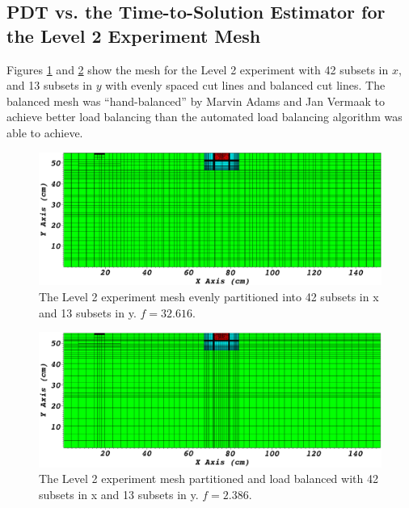 \FloatBarrier
\subsection{PDT vs. the Time-to-Solution Estimator for the Level 2 Experiment Mesh}
Figures \ref{level2_42x13} and \ref{level2_42x13_balanced} show the mesh for the Level 2 experiment with 42 subsets in $x$, and 13 subsets in $y$ with evenly spaced cut lines and balanced cut lines.
The balanced mesh was ``hand-balanced'' by Marvin Adams and Jan Vermaak to achieve better load balancing than the automated load balancing algorithm was able to achieve.
\begin{figure}[H]
\centering
\includegraphics[scale=0.28]{../../figures/level2_42x13.png}
\caption{The Level 2 experiment mesh evenly partitioned into 42 subsets in x and 13 subsets in y. $f = 32.616$.}
\label{level2_42x13}
\end{figure}
\begin{figure}[H]
\centering
\includegraphics[scale=0.28]{../../figures/level2_42x13_balanced.png}
\caption{The Level 2 experiment mesh partitioned and load balanced with 42 subsets in x and 13 subsets in y. $f = 2.386$.}
\label{level2_42x13_balanced}
\end{figure}

